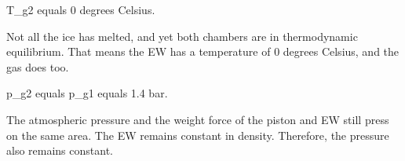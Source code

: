 T_g2 equals 0 degrees Celsius.  

Not all the ice has melted, and yet both chambers are in thermodynamic equilibrium. That means the EW has a temperature of 0 degrees Celsius, and the gas does too.  

p_g2 equals p_g1 equals 1.4 bar.  

The atmospheric pressure and the weight force of the piston and EW still press on the same area. The EW remains constant in density. Therefore, the pressure also remains constant.